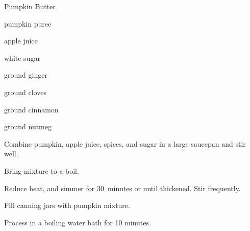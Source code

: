 \begin{recipe}{Pumpkin Butter}{}{}

\begin{ingredients}
\item \C{3\threequarter} pumpkin puree
\item \C{\threequarter} apple juice
\item \C{1\half} white sugar
\item {} ground ginger
\item \tp{\half} ground cloves
\item {} ground cinnamon
\item {} ground nutmeg
\end{ingredients}

\begin{directions}
\item Combine pumpkin, apple juice, spices, and sugar in a large saucepan and stir well.
\item Bring mixture to a boil. 
\item Reduce heat, and simmer for 30~minutes or until thickened. Stir frequently.
\item Fill canning jars with pumpkin mixture.
\item Process in a boiling water bath for 10 minutes.
\end{directions}
\end{recipe}
